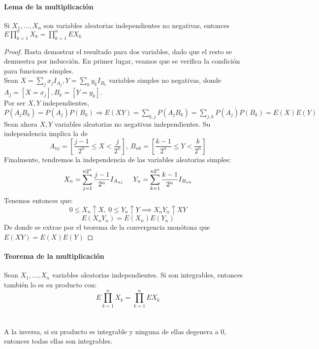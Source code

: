 \paragraph{Lema de la multiplicación}
\begin{lemma}
Si $X_1, \ldots , X_n$ son variables aleatorias independientes no negativas, entonces $E\displaystyle\prod_{k=1}^{n}X_k=\displaystyle\prod_{k=1}^{n} E X_k$
\end{lemma}
\begin{proof}
Basta demostrar el resultado para dos variables, dado que el resto se demuestra por inducción. En primer lugar, veamos que se verifica la condición para funciones simples.\\

Sean $X = \sum_j x_j I_{A_j}, Y = \sum_k y_k I_{B_k}$ variables simples no negativas, donde $A_j = [X = x_j], B_k = [Y = y_k]$.\\

Por ser $X,Y$ independientes, $P(A_jB_k) = P(A_j)P(B_k) \Rightarrow E(XY) = \sum_{k,j} P(A_jB_k) = \sum_{j,k} P(A_j)P(B_k) = E(X)E(Y)$\\

Sean ahora $X,Y$ variables aleatorias no negativas independientes. 
Su independencia implica la de
$$ A_{nj} = \left[\frac{j-1}{2^n} \leq X < \frac{j}{2^n}\right],\  B_{nk} = \left[\frac{k-1}{2^n} \leq Y < \frac{k}{2^n}\right]$$
Finalmente, tendremos la independencia de las variables aleatorias simples:
$$ X_n = \sum_{j=1}^{n2^n} \frac {j-1}{2^n}I_{A_{nj}}\hspace{0.5cm} Y_n = \sum_{k=1}^{n2^n} \frac {k-1}{2^n}I_{B_{nk}}$$
Tenemos entonces que:
$$ 0 \leq X_n \uparrow X, \ 0 \leq Y_n \uparrow Y \implies X_nY_n \uparrow XY$$
$$ E(X_nY_n) = E(X_n)E(Y_n)$$
De donde se extrae por el teorema de la convergencia monótona que $E(XY) = E(X)E(Y)$


\end{proof}

\paragraph{Teorema de la multiplicación}
\begin{theorem}
Sean $X_1,\ldots, X_n$ variables aleatorias independientes. Si son integrables, entonces también lo es su producto con: $$E\displaystyle\prod_{k=1}^n X_k=\displaystyle\prod_{k=1}^n E X_k$$
\\\\
A la inversa, si su producto es integrable y ninguna de ellas degenera a $0$, entonces todas ellas son integrables.
\end{theorem}

